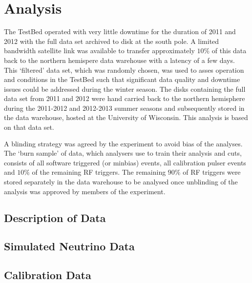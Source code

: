 \chapter{Analysis}
\label{chap:Analysis}


The TestBed operated with very little downtime for the duration of 2011 and 2012 with the full data set archived to disk at the south pole. A limited bandwidth satellite link was available to transfer approximately $10 \%$ of this data back to the northern hemispere data warehouse with a latency of a few days. This `filtered' data set, which was randomly chosen, was used to asses operation and conditions in the TestBed such that significant data quality and downtime issues could be addressed during the winter season. The disks containing the full data set from 2011 and 2012 were hand carried back to the northern hemisphere during the 2011-2012 and 2012-2013 summer seasons and subsequently stored in the data warehouse, hosted at the University of Wisconsin. This analysis is based on that data set.

A blinding strategy was agreed by the experiment to avoid bias of the analyses. The `burn sample' of data, which analysers use to train their analysis and cuts, consists of all software triggered (or minbias) events, all calibration pulser events and $10 \%$ of the remaining RF triggers. The remaining $90 \%$ of RF triggers were stored separately in the data warehouse to be analysed once unblinding of the analysis was approved by members of the experiment. 

\section{Description of Data}
\label{sec:Analysis:Data}







\section{Simulated Neutrino Data}
\label{sec:Analysis:MC-Data}



\section{Calibration Data}
\label{sec:Analysis:Calibration-Data}


